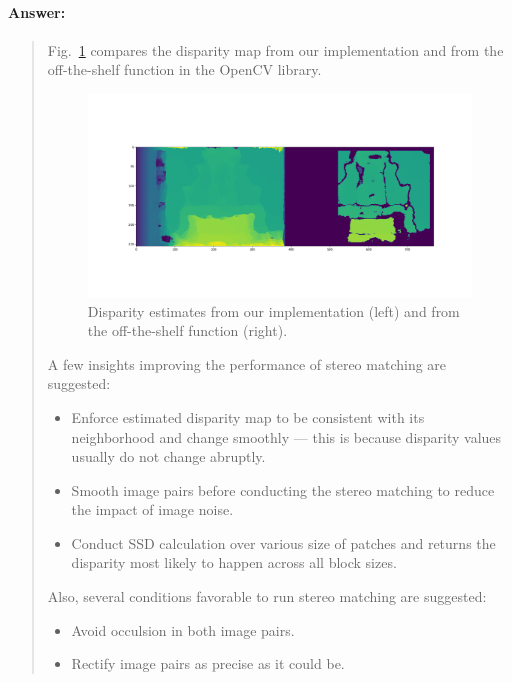 \documentclass[11pt]{article}
\begin{document}
\paragraph{Answer:} 
\begin{quote}

Fig.~\ref{fig:disparity_comparison} compares the disparity map from our implementation and from the off-the-shelf function in the OpenCV library.

\begin{figure}[h]
    \centering
    \includegraphics[width=1.0\linewidth]{figs/disparity_comparison.png}
    \caption{Disparity estimates from our implementation (left) and from the off-the-shelf function (right).}
    \label{fig:disparity_comparison}
\end{figure}

A few insights improving the performance of stereo matching are suggested:
\begin{itemize}
    \item Enforce estimated disparity map to be consistent with its neighborhood and change smoothly --- this is because disparity values usually do not change abruptly.
    \item Smooth image pairs before conducting the stereo matching to reduce the impact of image noise.
    \item Conduct SSD calculation over various size of patches and returns the disparity most likely to happen across all block sizes.
\end{itemize}


Also, several conditions favorable to run stereo matching are suggested:
\begin{itemize}
    \item Avoid occulsion in both image pairs.
    \item Rectify image pairs as precise as it could be.
\end{itemize}


\end{quote}
\end{document}
